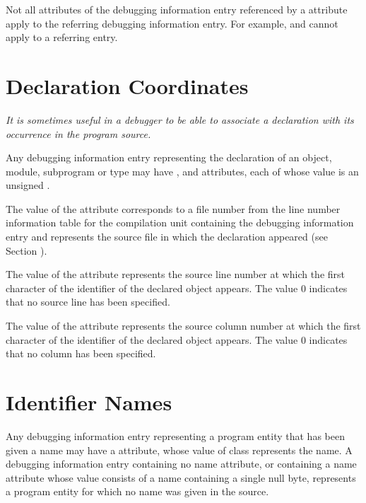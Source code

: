 Not all attributes of the debugging information entry referenced by a
\DWATspecification{} attribute
apply to the referring debugging information entry.
For
example,
\DWATsibling{} and
\DWATdeclaration{}
cannot apply to a
referring
entry.


\section{Declaration Coordinates}
\label{chap:declarationcoordinates}
\textit{It is sometimes useful in a debugger to be able to associate
a declaration with its occurrence in the program source.}

Any debugging information entry representing
the declaration of an object, module, subprogram or type may have
\DWATdeclfileDEFN,\hypertarget{chap:DWATdeclfilefilecontainingsourcedeclaration}{}
\DWATdecllineDEFN\hypertarget{chap:DWATdecllinelinenumberofsourcedeclaration}{}
 and
\DWATdeclcolumnDEFN\hypertarget{chap:DWATdeclcolumncolumnpositionofsourcedeclaration}{}
attributes, each of whose value is an unsigned
.

The value of
the
\DWATdeclfile{}
attribute
corresponds to
a file number from the line number information table for the
compilation unit containing the debugging information entry and
represents the source file in which the declaration appeared
(see Section ).
\db

The value of
the \DWATdeclline{} attribute represents
the source line number at which the first character of
the identifier of the declared object appears. The value 0
indicates that no source line has been specified.

The value of
the \DWATdeclcolumn{} attribute represents
the source column number at which the first character of
the identifier of the declared object appears. The value 0
indicates that no column has been specified.

\section{Identifier Names}
\label{chap:identifiernames}
Any\hypertarget{chap:DWATnamenameofdeclaration}{}
debugging information entry
representing
a program entity that has been given a name may have a
\DWATnameDEFN{}
attribute, whose value of
class \CLASSstring{} represents the name.
A debugging information entry containing
no name attribute, or containing a name attribute whose value
consists of a name containing a single null byte, represents
a program entity for which no name was given in the source.

